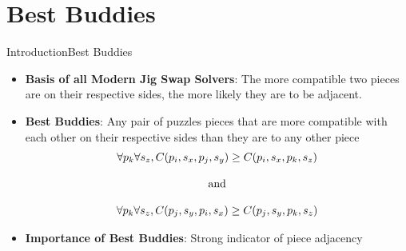\documentclass[handout,10pt]{beamer}  %
\begin{document}
\section{Best Buddies}
\begin{frame}{Introduction}{Best Buddies}\label{frame:bestBuddies}
    \begin{itemize}
        \item \textbf{Basis of all Modern Jig Swap Solvers}: The more compatible two pieces are on their respective sides, the more likely they are to be adjacent.
        \vfill
        \item \textbf{Best Buddies}: Any pair of puzzles pieces that are more compatible with each other on their respective sides than they are to any other piece~\cite{pomeranz2011}
        \vfill
\begin{equation}\label{eq:pomeranzBestBuddyDefinition}
\centering
\begin{split}
	\begin{matrix}
		\forall{p_{k}}\forall{s_z},C(p_i, s_x, p_j, s_y) \geq C(p_i, s_x, p_k, s_z)
		\\
		\\
		\textnormal{and}
		\\
		\\
		\forall{p_{k}}\forall{s_z},C(p_j, s_y, p_i, s_x) \geq C(p_j, s_y, p_k, s_z)
	\end{matrix}
\end{split}
\end{equation} 
        \vfill
        \item \textbf{Importance of Best Buddies}: Strong indicator of piece adjacency
    \end{itemize}
\end{frame}
\end{document}
